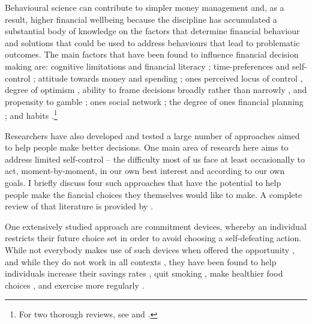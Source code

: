 Behavioural science can contribute to simpler money management and, as a
result, higher financial wellbeing because the discipline has accumulated a
substantial body of knowledge on the factors that determine financial behaviour
and solutions that could be used to address behaviours that lead to problematic
outcomes. The main factors that have been found to influence financial decision
making are: cognitive limitations and financial literacy \citep{agarwal2009age,
    agarwal2013cognitive, korniotis2011older, agarwal2010learning,
fernandes2014financial, jorring2020financial}; time-preferences and
self-control \citep{frederick2002time, read2018intertemporal,
ericson2019intertemporal, cohen2020measuring}; attitude towards money and
spending \citep{rick2008tightwads, rick2011fatal}; ones perceived locus of
control \citep{perry2005control}, degree of optimism \citep{puri2007optimism},
ability to frame decisions broadly rather than narrowly
\citep{kumar2008decision}, and propensity to gamble \citep{kumar2009gambles};
ones social network \citep{bailey2018economic, kuchler2021social}; the degree
of ones financial planning \citep{ameriks2003wealth}; and habits
\citep{blumenstock2018defaults, schaner2018persistent,
de2013deposit}.\footnote{For two thorough reviews, see
\citet{agarwal2017shapes} and \citet{greenberg2019financial}.}

Researchers have also developed and tested a large number of approaches aimed
to help people make better decisions. One main area of research here aims to
address limited self-control -- the difficulty most of us face at least
occasionally to act, moment-by-moment, in our own best interest and according
to our own goals. I briefly discuss four such approaches that have the
potential to help people make the fiancial choices they themselves would like
to make. A complete review of that literature is provided by
\citet{duckworth2018beyond}.

One extensively studied approach are commitment devices, whereby an individual
restricts their future choice set in order to avoid choosing a self-defeating
action. While not everybody makes use of such devices when offered the
opportunity \citep{bryan2010commitment}, and while they do not work in all
contexts \citep{laibson2015don,robinson2018some}, they have been found to help
individuals increase their savings rates \citep{ashraf2006tying}, quit smoking
\citep{gine2010put}, make healthier food choices \citep{schwartz2014healthier},
and exercise more regularly \citep{royer2015incentives}.

